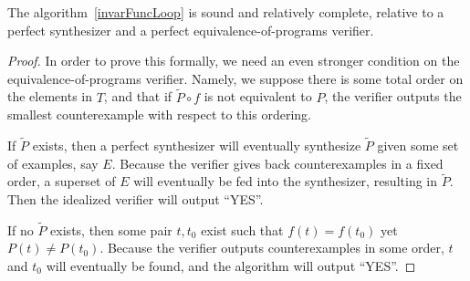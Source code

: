 \documentclass{llncs}
\begin{document}
\begin{theorem}
  The algorithm~\ref{invarFuncLoop} is sound and relatively complete,
  relative to a perfect synthesizer and a perfect equivalence-of-programs
  verifier.
\end{theorem}
\begin{proof}
  In order to prove this formally, we need an even stronger condition on the
  equivalence-of-programs verifier.
  Namely, we suppose there is some total order on the elements in $T$,
  and that if $\widetilde{P}\circ f$ is not equivalent to $P$,
  the verifier outputs the smallest counterexample with respect to this
  ordering.

  If $\widetilde{P}$ exists, then a perfect synthesizer will eventually
  synthesize $\widetilde{P}$ given some set of examples, say $E$.
  Because the verifier gives back counterexamples in a fixed order,
  a superset of $E$ will eventually be fed into the synthesizer,
  resulting in $\widetilde{P}$.
  Then the idealized verifier will output ``YES''.

  If no $\widetilde{P}$ exists, then some pair $t, t_0$ exist
  such that $f(t)=f(t_0)$ yet $P(t)\ne P(t_0)$.
  Because the verifier outputs counterexamples in some order,
  $t$ and $t_0$ will eventually be found, and the algorithm will output ``YES''.
\end{proof}


%
%


\end{document}
